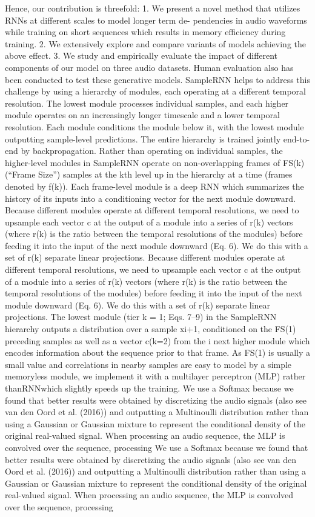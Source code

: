 \cite{Mehri2016} Hence, our contribution is threefold:
1. We present a novel method that utilizes RNNs at different scales to model longer term de- pendencies in audio waveforms while training on short sequences which results in memory efficiency during training.
2. We extensively explore and compare variants of models achieving the above effect.
3. We study and empirically evaluate the impact of different components of our model on three audio datasets. Human evaluation also has been conducted to test these generative models.
SampleRNN helps to address this challenge by using a hierarchy of modules, each operating at a different temporal resolution. The lowest module processes individual samples, and each higher module operates on an increasingly longer timescale and a lower temporal resolution. Each module conditions the module below it, with the lowest module outputting sample-level predictions. The entire hierarchy is trained jointly end-to-end by backpropagation.
Rather than operating on individual samples, the higher-level modules in SampleRNN operate on non-overlapping frames of FS(k) (“Frame Size”) samples at the kth level up in the hierarchy at a time (frames denoted by f(k)). Each frame-level module is a deep RNN which summarizes the history of its inputs into a conditioning vector for the next module downward.
Because different modules operate at different temporal resolutions, we need to upsample each
vector c at the output of a module into a series of r(k) vectors (where r(k) is the ratio between the temporal resolutions of the modules) before feeding it into the input of the next module downward (Eq. 6). We do this with a set of r(k) separate linear projections.
Because different modules operate at different temporal resolutions, we need to upsample each
vector c at the output of a module into a series of r(k) vectors (where r(k) is the ratio between the temporal resolutions of the modules) before feeding it into the input of the next module downward (Eq. 6). We do this with a set of r(k) separate linear projections.
The lowest module (tier k = 1; Eqs. 7–9) in the SampleRNN hierarchy outputs a distribution over a sample xi+1, conditioned on the FS(1) preceding samples as well as a vector c(k=2)
from the i
next higher module which encodes information about the sequence prior to that frame. As FS(1) is usually a small value and correlations in nearby samples are easy to model by a simple memoryless module, we implement it with a multilayer perceptron (MLP) rather thanRNNwhich slightly speeds up the training. 
We use a Softmax because we found that better results were obtained by discretizing the audio signals (also see van den Oord et al. (2016)) and outputting a Multinoulli distribution rather than using a Gaussian or Gaussian mixture to represent the conditional density of the original real-valued signal. When processing an audio sequence, the MLP is convolved over the sequence, processing We use a Softmax because we found that better results were obtained by discretizing the audio signals (also see van den Oord et al. (2016)) and outputting a Multinoulli distribution rather than using a Gaussian or Gaussian mixture to represent the conditional density of the original real-valued signal. When processing an audio sequence, the MLP is convolved over the sequence, processing
